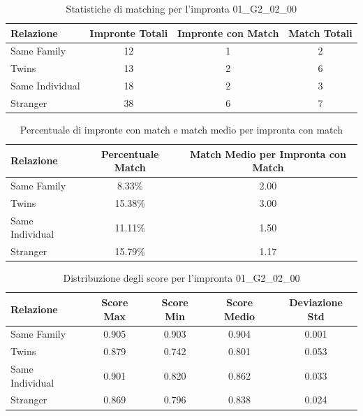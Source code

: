 \begin{table}[htbp]
\centering
\caption{Statistiche di matching per l'impronta 01\_G2\_02\_00}
\label{tab:results_01_G2_02_00}
\begin{tabular}{|l|c|c|c|}
\hline
\textbf{Relazione} & \textbf{Impronte Totali} & \textbf{Impronte con Match} & \textbf{Match Totali} \\
\hline
Same Family & 12 & 1 & 2 \\
\hline
Twins & 13 & 2 & 6 \\
\hline
Same Individual & 18 & 2 & 3 \\
\hline
Stranger & 38 & 6 & 7 \\
\hline
\end{tabular}
\end{table}


\begin{table}[htbp]
\centering
\caption{Percentuale di impronte con match e match medio per impronta con match}
\label{tab:match_percentage_01_G2_02_00}
\begin{tabular}{|l|c|c|}
\hline
\textbf{Relazione} & \textbf{Percentuale Match} & \textbf{Match Medio per Impronta con Match} \\
\hline
Same Family & 8.33\% & 2.00 \\
\hline
Twins & 15.38\% & 3.00 \\
\hline
Same Individual & 11.11\% & 1.50 \\
\hline
Stranger & 15.79\% & 1.17 \\
\hline
\end{tabular}
\end{table}


\begin{table}[htbp]
\centering
\caption{Distribuzione degli score per l'impronta 01\_G2\_02\_00}
\label{tab:scores_01_G2_02_00}
\begin{tabular}{|l|c|c|c|c|}
\hline
\textbf{Relazione} & \textbf{Score Max} & \textbf{Score Min} & \textbf{Score Medio} & \textbf{Deviazione Std} \\
\hline
Same Family & 0.905 & 0.903 & 0.904 & 0.001 \\
\hline
Twins & 0.879 & 0.742 & 0.801 & 0.053 \\
\hline
Same Individual & 0.901 & 0.820 & 0.862 & 0.033 \\
\hline
Stranger & 0.869 & 0.796 & 0.838 & 0.024 \\
\hline
\end{tabular}
\end{table}

